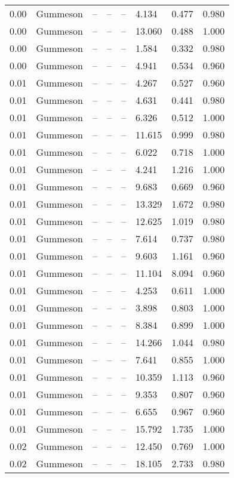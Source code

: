 \begin{table}[H]
\begin{tabular}{l c l l l}
0.00 & Gummeson & -- & -- & -- & 4.134 & 0.477 & 0.980 \\
0.00 & Gummeson & -- & -- & -- & 13.060 & 0.488 & 1.000 \\
0.00 & Gummeson & -- & -- & -- & 1.584 & 0.332 & 0.980 \\
0.00 & Gummeson & -- & -- & -- & 4.941 & 0.534 & 0.960 \\
0.01 & Gummeson & -- & -- & -- & 4.267 & 0.527 & 0.960 \\
0.01 & Gummeson & -- & -- & -- & 4.631 & 0.441 & 0.980 \\
0.01 & Gummeson & -- & -- & -- & 6.326 & 0.512 & 1.000 \\
0.01 & Gummeson & -- & -- & -- & 11.615 & 0.999 & 0.980 \\
0.01 & Gummeson & -- & -- & -- & 6.022 & 0.718 & 1.000 \\
0.01 & Gummeson & -- & -- & -- & 4.241 & 1.216 & 1.000 \\
0.01 & Gummeson & -- & -- & -- & 9.683 & 0.669 & 0.960 \\
0.01 & Gummeson & -- & -- & -- & 13.329 & 1.672 & 0.980 \\
0.01 & Gummeson & -- & -- & -- & 12.625 & 1.019 & 0.980 \\
0.01 & Gummeson & -- & -- & -- & 7.614 & 0.737 & 0.980 \\
0.01 & Gummeson & -- & -- & -- & 9.603 & 1.161 & 0.960 \\
0.01 & Gummeson & -- & -- & -- & 11.104 & 8.094 & 0.960 \\
0.01 & Gummeson & -- & -- & -- & 4.253 & 0.611 & 1.000 \\
0.01 & Gummeson & -- & -- & -- & 3.898 & 0.803 & 1.000 \\
0.01 & Gummeson & -- & -- & -- & 8.384 & 0.899 & 1.000 \\
0.01 & Gummeson & -- & -- & -- & 14.266 & 1.044 & 0.980 \\
0.01 & Gummeson & -- & -- & -- & 7.641 & 0.855 & 1.000 \\
0.01 & Gummeson & -- & -- & -- & 10.359 & 1.113 & 0.960 \\
0.01 & Gummeson & -- & -- & -- & 9.353 & 0.807 & 0.960 \\
0.01 & Gummeson & -- & -- & -- & 6.655 & 0.967 & 0.960 \\
0.01 & Gummeson & -- & -- & -- & 15.792 & 1.735 & 1.000 \\
0.02 & Gummeson & -- & -- & -- & 12.450 & 0.769 & 1.000 \\
0.02 & Gummeson & -- & -- & -- & 18.105 & 2.733 & 0.980 \\

\end{tabular}
\end{table}
